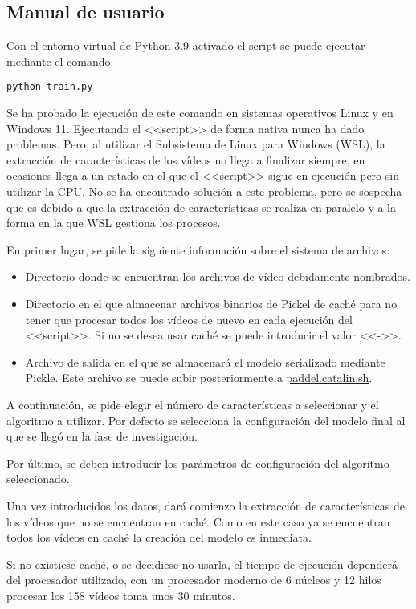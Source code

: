 \subsection{Manual de usuario}

Con el entorno virtual de Python 3.9 activado el script se puede ejecutar
mediante el comando:

\texttt{python train.py}

Se ha probado la ejecución de este comando en sistemas operativos Linux y en
Windows 11. Ejecutando el <<script>> de forma nativa nunca ha dado problemas.
Pero, al utilizar el Subsistema de Linux para Windows (WSL), la extracción de
características de los vídeos no llega a finalizar siempre, en ocasiones llega a
un estado en el que el <<script>> sigue en ejecución pero sin utilizar la CPU.
No se ha encontrado solución a este problema, pero se sospecha que es debido a
que la extracción de características se realiza en paralelo y a la forma en la
que WSL gestiona los procesos.

En primer lugar, se pide la siguiente información sobre el sistema de archivos:

\begin{itemize}
    \item Directorio donde se encuentran los archivos de vídeo debidamente
    nombrados.
    \item Directorio en el que almacenar archivos binarios de Pickel de caché
    para no tener que procesar todos los vídeos de nuevo en cada ejecución del
    <<script>>. Si no se desea usar caché se puede introducir el valor <<->>.
    \item Archivo de salida en el que se almacenará el modelo serializado
    mediante Pickle. Este archivo se puede subir posteriormente a
    \href{https://paddel.catalin.sh}{paddel.catalin.sh}.
\end{itemize}


A continuación, se pide elegir el número de características a seleccionar y el
algoritmo a utilizar. Por defecto se selecciona la configuración del modelo
final al que se llegó en la fase de investigación.


Por último, se deben introducir los parámetros de configuración del algoritmo
seleccionado.


Una vez introducidos los datos, dará comienzo la extracción de características
de los vídeos que no se encuentran en caché. Como en este caso ya se encuentran
todos los vídeos en caché la creación del modelo es inmediata.

Si no existiese caché, o se decidiese no usarla, el tiempo de ejecución
dependerá del procesador utilizado, con un procesador moderno de 6 núcleos y 12
hilos procesar los 158 vídeos toma unos 30 minutos.
